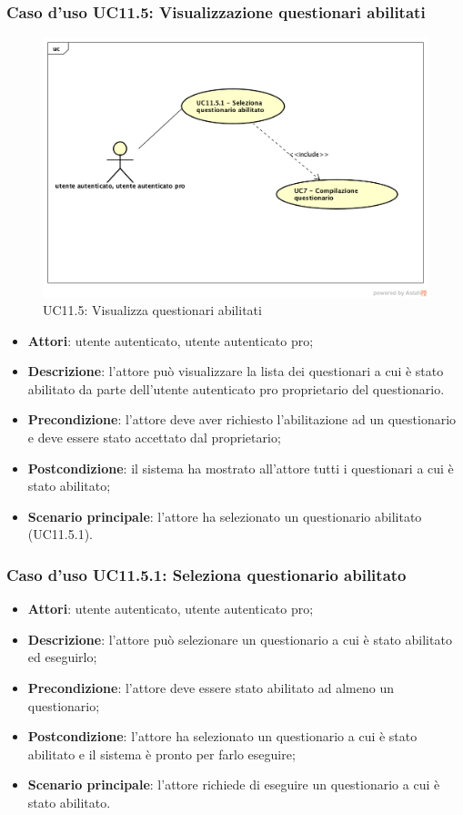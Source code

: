 \subsubsection{Caso d'uso UC11.5: Visualizzazione questionari abilitati}
\label{UC11.5}
\begin{figure}[h]
	\centering
	\includegraphics[scale=0.5]{UML/UC11_5.png}
	\caption{UC11.5: Visualizza questionari abilitati}
\end{figure}
\begin{itemize}
\item\textbf{Attori}: utente autenticato, utente autenticato pro;
\item\textbf{Descrizione}: l'attore può visualizzare la lista dei questionari a cui è stato abilitato da parte dell'utente autenticato pro proprietario del questionario.
\item\textbf{Precondizione}: l'attore deve aver richiesto l'abilitazione ad un questionario e deve essere stato accettato dal proprietario;
\item\textbf{Postcondizione}: il sistema ha mostrato all'attore tutti i questionari a cui è stato abilitato;
\item\textbf{Scenario principale}: l'attore ha selezionato un questionario abilitato (UC11.5.1).
\end{itemize}

\subsubsection{Caso d'uso UC11.5.1: Seleziona questionario abilitato}
\begin{itemize}
\item\textbf{Attori}: utente autenticato, utente autenticato pro;
\item\textbf{Descrizione}: l'attore può selezionare un questionario a cui è stato abilitato ed eseguirlo;
\item\textbf{Precondizione}: l'attore deve essere stato abilitato ad almeno un questionario;
\item\textbf{Postcondizione}: l'attore ha selezionato un questionario a cui è stato abilitato e il sistema è pronto per farlo eseguire;
\item\textbf{Scenario principale}: l'attore richiede di eseguire un questionario a cui è stato abilitato.
\end{itemize}
